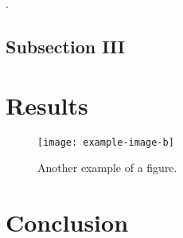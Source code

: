 \documentclass[isoft]{ssltexposter}
\begin{document}
\begin{poster}
            \vspace{1cm}
            \begin{table}
                \centering
                \captionsetup{type=table}
                \caption{Example of a table.}
                \label{Corpus}
                \renewcommand{\arraystretch}{1.2}
            \end{table}
            \vspace{1cm}
            
            \lipsum[57]
            
            \citep{defects2j}.
    
            \subsection{Subsection III}
                \lipsum[57]
    
        \section{Results}%
                
            \lipsum[57]  
    
            \begin{figure}
                \centering
                \captionsetup{type=figure}
                \texttt{[image: example-image-b]}
                \caption{Another example of a figure.}
                \label{fig:result}
            \end{figure}
    
            \lipsum[57]
            \cite{chollet2015keras}     
    
        \section{Conclusion}
    

\end{poster}
\end{document}
